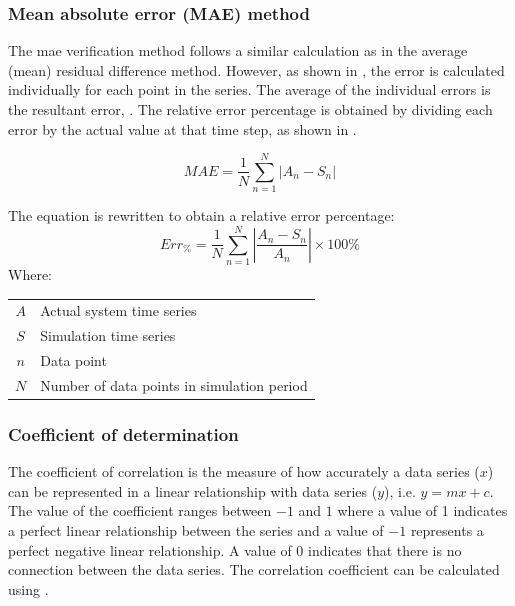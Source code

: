  		\subsubsection{Mean absolute error (MAE) method}
 		The \gls{mae} verification method follows a similar calculation as in the average (mean) residual difference method. However, as shown in , the error is calculated individually for each point in the series. The average of the individual errors is the resultant error, . The relative error percentage is obtained by dividing each error by the actual value at that time step, as shown in .
 		\par
 		\begin{equation}
 		\label{eq: Relative error 2}
 		MAE = \dfrac{1}{N}\sum_{n=1}^{N}{\left|A_{n} - S_{n}\right| }
 		\end{equation}
 		
 			The equation is rewritten to obtain a relative error percentage:	
 			\begin{equation}
 			\label{eq: Relative error}
 			Err_{\%} = \dfrac{1}{N}\sum_{n=1}^{N}{\left|\dfrac{A_{n} - S_{n}}{A_{n}}\right| }\times 100 \%
 			\end{equation}
 			Where: \par
 			\begin{table}[!htbp]
 				\centering
 				\begin{tabular}{cl}
 					$A$ & Actual system time series \\
 					$S$ & Simulation time series \\
 					$n$ & Data point \\
 					$N$ & Number of data points in simulation period \\
 				\end{tabular} 
 			\end{table} 
 		\subsubsection{Coefficient of determination}
 		The coefficient of correlation is the measure of how accurately a data series ($ x $) can be represented in a linear relationship with data series ($ y $), i.e. $ y = mx+c$. The value of the coefficient ranges between $ -1 $ and $ 1 $ where a value of 1 indicates a perfect linear relationship between the series and a value of $ -1 $ represents a perfect negative linear relationship. A value of 0 indicates that there is no connection between the data series. The correlation coefficient can be calculated using  \cite{sarin2010comparing}.
 		
